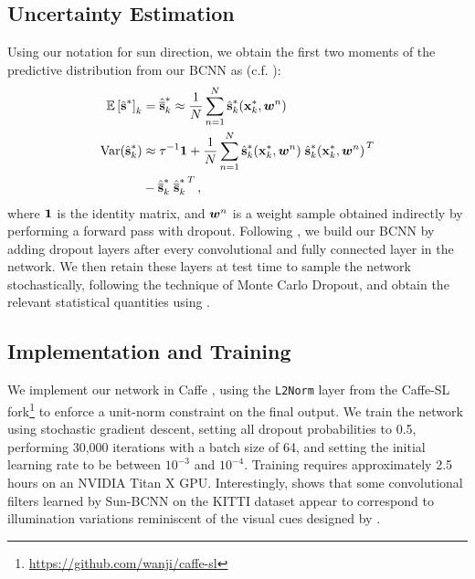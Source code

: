 \subsection{Uncertainty Estimation}
Using our notation for sun direction, we obtain the first two moments of the predictive distribution from our BCNN as (c.f. ):
\begin{align}
\label{eq:sun_direction_mean}
\mathbb{E}\left[{\hat{\boldsymbol{\mathbf{s}}}}^*\right]_k &= {\hat{\overline{\boldsymbol{\mathbf{s}}}}}^*_k \approx \frac{1}{N} \sum_{n=1}^N {\hat{\boldsymbol{\mathbf{s}}}}^*_k ({\boldsymbol{\mathbf{x}}}^*_k, \boldsymbol{w}^n) \\
\text{Var}({\hat{\boldsymbol{\mathbf{s}}}_k}^*) &\approx \tau^{-1} \boldsymbol{\mathbf{1}} 
 +  \frac{1}{N} \sum_{n=1}^N {\hat{\boldsymbol{\mathbf{s}}}}^*_k({\boldsymbol{\mathbf{x}}}^*_k, \boldsymbol{w}^n) \left.{{\hat{\boldsymbol{\mathbf{s}}}_k}^*({\boldsymbol{\mathbf{x}}}^*_k, \boldsymbol{w}^n)}\right.^T \notag \\ 
 &- {\hat{\overline{\boldsymbol{\mathbf{s}}}}}^*_k \left.{{\hat{\overline{\boldsymbol{\mathbf{s}}}}}^*_k}\right.^T,
 \label{eq:bcnn_covar}
\end{align}
where $\boldsymbol{\mathbf{1}}$ is the identity matrix, and $\boldsymbol{w}^n$ is a weight sample obtained indirectly by performing a forward pass with dropout.
Following \citet{Gal2016CNN}, we build our BCNN by adding dropout layers after every convolutional and fully connected layer in the network. 
We then retain these layers at test time to sample the network stochastically, following the technique of Monte Carlo Dropout, and obtain the relevant statistical quantities using . 

\subsection{Implementation and Training}
We implement our network in Caffe \citep{jia2014caffe}, using the \texttt{L2Norm} layer from the Caffe-SL fork\footnote{\url{https://github.com/wanji/caffe-sl}} to enforce a unit-norm constraint on the final output.
We train the network using stochastic gradient descent, setting all dropout probabilities to 0.5, performing 30,000 iterations with a batch size of 64, and setting the initial learning rate to be between $10^{-3}$ and $10^{-4}$. 
Training requires approximately 2.5 hours on an NVIDIA Titan X GPU.
Interestingly,  shows that some convolutional filters learned by Sun-BCNN on the KITTI dataset appear to correspond to illumination variations reminiscent of the visual cues designed by \citet{Lalonde2011-jw}.

